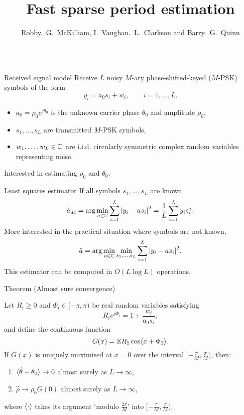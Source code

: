 \documentclass[final,hyperref={pdfpagelabels=false}]{beamer}
\title[]{Fast sparse period estimation}
\author{Robby.~G.~McKilliam, I.~Vaughan.~L.~Clarkson and Barry.~G.~Quinn}
\begin{document}


\begin{columns}[t] %
\begin{column}{.49\textwidth} %

\newcommand{\calC}{{\mathcal C}}
\begin{block}{Received signal model}
Receive $L$ noisy $M$-ary phase-shifted-keyed ($M$-PSK) symbols of the form
\[
y_i = a_0 s_i + w_i, \qquad i = 1, \dots, L.
\]
\begin{itemize}
\item $a_0 = \rho_0 e^{j\theta_0}$ is the unknown carrier phase $\theta_0$ and amplitude $\rho_0$,
\item $s_1,\dots,s_L$ are transmitted $M$-PSK symbols,
\item $w_1,\dots,w_L \in {\mathbb C}$ are i.i.d. circularly symmetric complex random variables representing noise.
\end{itemize}

Interested in estimating $\rho_0$ and $\theta_0$.
\end{block}  

\begin{block}{Least squares estimator}
If all symbols $s_1,\dots,s_L$ are known
\[
\hat{a}_{\text{uc}} = \arg \min_{a \in {\mathbb C}} \sum_{i = 1}^L {\left\vert  y_i - a s_i  \right\vert}^2  = \frac{1}{L} \sum_{i = 1}^L y_i s_i^*.
\]
More interested in the practical situation where symbols are not known,
\[
\hat{a} = \arg\min_{a \in {\mathbb C}} \min_{s_1, \dots, s_L} \sum_{i = 1}^L {\left\vert  y_i - a s_i  \right\vert}^2.
\]
This estimator can be computed in $O(L\log L)$ operations.
\end{block}  


\begin{block}{Theorem (Almost sure convergence)}

Let $R_i \geq 0$ and $\Phi_i \in [-\pi,\pi)$ be real random variables satisfying
\vspace{-0.15cm}
\[
R_ie^{j\Phi_i} = 1 + \frac{w_i}{a_0 s_i},
\]
and define the continuous function
\[
G(x) = {\mathbb E} R_1 \cos\langle  x + \Phi_1 \rangle.
\] 
If $G(x)$ is uniquely maximised at $x = 0$ over the interval $[-\tfrac{\pi}{M},\tfrac{\pi}{M})$, then:
\begin{enumerate}
\item \vspace{-0.15cm} $\langle \hat{\theta} - \theta_0 \rangle \rightarrow 0$ almost surely as $L \rightarrow \infty$,
\item \vspace{-0.2cm} $\hat{\rho} \rightarrow \rho_0 G(0)$ almost surely as $L \rightarrow \infty$,
\end{enumerate}
where $\langle \cdot \rangle$ takes its argument `modulo $\tfrac{2\pi}{M}$' into $[-\tfrac{\pi}{M},\tfrac{\pi}{M})$.
\end{block}


\end{column}
\end{columns}
\end{document}
